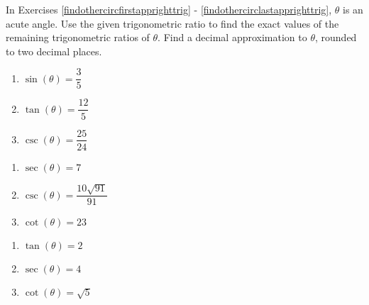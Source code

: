 \newpage

In Exercises \ref{findothercircfirstapprighttrig} - \ref{findothercirclastapprighttrig}, $\theta$ is an acute angle.  Use the given trigonometric ratio to find the exact values of the remaining trigonometric ratios of $\theta$.  Find a decimal approximation to $\theta$, rounded to two decimal places.

\begin{multicols}{3}

\begin{enumerate}
\setcounter{enumi}{\value{HW}}

\item $\sin(\theta) = \dfrac{3}{5}$  \label{findothercircfirstapprighttrig}
\item $\tan(\theta) = \dfrac{12}{5}$
\item $\csc(\theta) = \dfrac{25}{24}$

\setcounter{HW}{\value{enumi}}

\end{enumerate}

\end{multicols}

\begin{multicols}{3}

\begin{enumerate}

\setcounter{enumi}{\value{HW}}


\item $\sec(\theta) = 7$  
\item $\csc(\theta) = \dfrac{10\sqrt{91}}{91}$ 
\item $\cot(\theta) = 23$ 

\setcounter{HW}{\value{enumi}}

\end{enumerate}

\end{multicols}

\begin{multicols}{3}

\begin{enumerate}

\setcounter{enumi}{\value{HW}}




\item  $\tan(\theta) = 2$  
\item  $\sec(\theta) = 4$  
\item $\cot(\theta) = \sqrt{5}$ 

\setcounter{HW}{\value{enumi}}

\end{enumerate}

\end{multicols}


